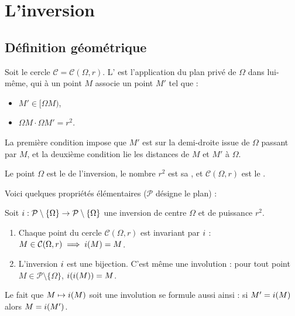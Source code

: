 \documentclass[11pt,class=report,crop=false]{standalone}
\begin{document}
\section{L'inversion}

\subsection{Définition géométrique}

Soit le cercle $\mathcal{C} = \mathcal{C}(\Omega,r)$. L' est l'application
du plan privé de $\Omega$ dans lui-même, qui à un point $M$ associe un point $M'$ tel que :
\begin{itemize}
  \item $M' \in [\Omega M)$,
  \item $\Omega M \cdot \Omega M' = r^2$.
\end{itemize}


La première condition impose que $M'$ est sur la demi-droite issue de $\Omega$ passant par $M$,
et la deuxième condition lie les distances de $M$ et $M'$ à $\Omega$.

Le point $\Omega$ est le  de l'inversion, le nombre
$r^2$ est sa , et $\mathcal{C}(\Omega,r)$ est le .

Voici quelques propriétés élémentaires ($\mathcal{P}$ désigne le plan) :
\begin{proposition}
Soit $i : \mathcal{P} \setminus \{\Omega\} \to \mathcal{P} \setminus \{\Omega\}$ une inversion de centre $\Omega$ et de puissance $r^2$.
\begin{enumerate}
  \item Chaque point du cercle $\mathcal{C}(\Omega,r)$ est invariant par $i$ :
  $M \in \mathcal{C}(\Omega,r) \implies i(M) = M$.
  
  \item L'inversion $i$ est une bijection. 
  C'est même une involution : pour tout point $M \in \mathcal{P} \setminus \{\Omega\}$, $i(i(M)) = M$.
\end{enumerate}
\end{proposition}

Le fait que $M \mapsto i(M)$ soit une involution se formule aussi ainsi : si $M'=i(M)$ alors 
$M = i(M')$.
\end{document}
